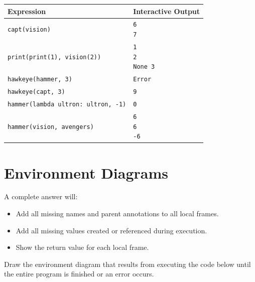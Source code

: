 \documentclass{exam}
\begin{document}
\begin{solution}
\begin{center}
\begin{tabular}{|m{8cm}|m{6cm}|}
\hline
\textbf{Expression} & \textbf{Interactive Output} \\
\hline
\lstinline$capt(vision)$ & \color{red} \texttt{6 \newline 7}  \\ [2.5em]
\hline
\lstinline$print(print(1), vision(2))$ & \color{red}\texttt{1 \newline 2 \newline None 3} \\ [2.5em]
\hline
\lstinline$hawkeye(hammer, 3)$ & \color{red}\texttt{Error} \\ [2.5em]
\hline
\lstinline$hawkeye(capt, 3)$& \color{red}\texttt{9} \\ [2.5em]
\hline
\lstinline$hammer(lambda ultron: ultron, -1)$ & \color{red}\texttt{0} \\ [2.5em]
\hline
\lstinline$hammer(vision, avengers)$ & \color{red}\texttt{6 \newline 6 \newline -6} \\ [2.5em]
\hline
\end{tabular}
\end{center}
\end{solution}

\newpage

\section{Environment Diagrams}
A complete answer will:
\begin{itemize}
\item Add all missing names and parent annotations to all local frames.
\item Add all missing values created or referenced during execution.
\item Show the return value for each local frame. 
\end{itemize}
Draw the environment diagram that results from executing the code below until the entire program
is finished or an error occurs.
\end{document}
